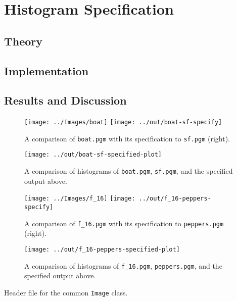 \documentclass[headings=optiontoheadandtoc,listof=totoc]{scrartcl}
\newenvironment{longlisting}{\captionsetup{type=listing}}{}
\begin{document}
\section{Histogram Specification}

\subsection{Theory}

\subsection{Implementation}

\subsection{Results and Discussion}
\label{sec:specification-results}

\begin{figure}[ht]
	\centering
	\texttt{[image: ../Images/boat]}
	\texttt{[image: ../out/boat-sf-specify]}
	\caption{A comparison of \texttt{boat.pgm} with its specification to \texttt{sf.pgm} (right).}
\end{figure}

\begin{figure}[ht]
	\centering\texttt{[image: ../out/boat-sf-specified-plot]}
	\caption{A comparison of histograms of \texttt{boat.pgm}, \texttt{sf.pgm}, and the specified output above.}
\end{figure}

\begin{figure}[ht]
	\centering
	\texttt{[image: ../Images/f\_16]}
	\texttt{[image: ../out/f\_16-peppers-specify]}
	\caption{A comparison of \texttt{f\_16.pgm} with its specification to \texttt{peppers.pgm} (right).}
\end{figure}

\begin{figure}[ht]
	\centering\texttt{[image: ../out/f\_16-peppers-specified-plot]}
	\caption{A comparison of histograms of \texttt{f\_16.pgm}, \texttt{peppers.pgm}, and the specified output above.}
\end{figure}

\clearpage
\listoflistings

\begin{longlisting}
	\caption{Header file for the common \texttt{Image} class.}
\end{longlisting}
\end{document}
